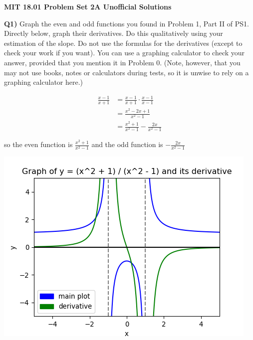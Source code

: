 \documentclass[9pt]{article}
\begin{document}
\begin{center}
  \large\textbf{MIT 18.01 Problem Set 2A Unofficial Solutions}
\end{center}

\begin{tcolorbox}
  \textbf{Q1)} Graph the even and odd functions you found in Problem 1, Part II of PS1. Directly below, graph their derivatives. Do this qualitatively using your estimation of the slope. Do not use the formulas for the derivatives (except to check your work if you want). You can use a graphing calculator to check your answer, provided that you mention it in Problem 0. (Note, however, that you may not use books, notes or calculators during tests, so it is unwise to rely on a graphing calculator here.)
\end{tcolorbox}

\begin{align*}
  \frac{x - 1}{x + 1} &= \frac{x - 1}{x + 1} \cdot \frac{x - 1}{x - 1}\\
                      &= \frac{x^2 - 2x + 1}{x^2 - 1}\\
                      &= \frac{x^2 + 1}{x^2 - 1} - \frac{2x}{x^2 - 1}
\end{align*}

so the even function is $\frac{x^2 + 1}{x^2 - 1}$ and the odd function is $-\frac{2x}{x^2 - 1}$

\begin{center}
  \includegraphics[scale=0.8]{q1_even.png}
\end{center}
\end{document}
